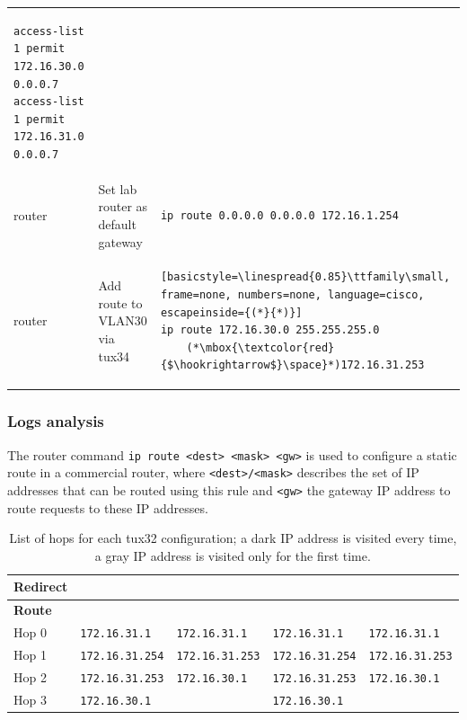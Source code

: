 \documentclass[a4paper, 11pt]{report}
\newcommand\greencheckmark{{\color{ForestGreen}\ding{52}}}
\newcommand\redcross{{\color{red}\ding{54}}}
\begin{document}
\begin{center}
\begin{tabular}{@{}l | m{67mm} | l@{}}
\begin{lstlisting}[basicstyle=\linespread{0.85}\ttfamily\small, frame=none, numbers=none, language=cisco]
access-list 1 permit 172.16.30.0 0.0.0.7
access-list 1 permit 172.16.31.0 0.0.0.7
        \end{lstlisting}\\
        router & Set lab router as default gateway & \begin{lstlisting}[basicstyle=\linespread{0.85}\ttfamily\small, frame=none, numbers=none, language=cisco]
ip route 0.0.0.0 0.0.0.0 172.16.1.254
        \end{lstlisting}\\
        router & Add route to VLAN30 via tux34 & \begin{lstlisting}[basicstyle=\linespread{0.85}\ttfamily\small, frame=none, numbers=none, language=cisco, escapeinside={(*}{*)}]
ip route 172.16.30.0 255.255.255.0
    (*\mbox{\textcolor{red}{$\hookrightarrow$}\space}*)172.16.31.253
        \end{lstlisting}
    \end{tabular}
\end{center}

\subsubsection{Logs analysis} \label{sec:Log4}

The router command \texttt{ip route <dest> <mask> <gw>} is used to configure a static route in a commercial router, where \texttt{<dest>/<mask>} describes the set of IP addresses that can be routed using this rule and \texttt{<gw>} the gateway IP address to route requests to these IP addresses.

\begin{table}[h]
    \centering
    \begin{tabular}{@{}l | l | l | l | l@{}}
        \textbf{Redirect} & \redcross              & \redcross              & \greencheckmark        & \greencheckmark        \\ \hline
        \textbf{Route   } & \redcross              & \greencheckmark        & \redcross              & \greencheckmark        \\ \hline
        Hop 0             & \texttt{172.16.31.1  } & \texttt{172.16.31.1  } & \texttt{172.16.31.1  } & \texttt{172.16.31.1  } \\
        Hop 1             & \texttt{172.16.31.254} & \texttt{172.16.31.253} & \texttt{\color{gray}172.16.31.254} & \texttt{172.16.31.253} \\
        Hop 2             & \texttt{172.16.31.253} & \texttt{172.16.30.1  } & \texttt{172.16.31.253} & \texttt{172.16.30.1  } \\
        Hop 3             & \texttt{172.16.30.1  } & \texttt{             } & \texttt{172.16.30.1  } & \texttt{             } \\
    \end{tabular}
    \caption{List of hops for each tux32 configuration; a dark IP address is visited every time, a gray IP address is visited only for the first time.}
\end{table}
\end{document}
